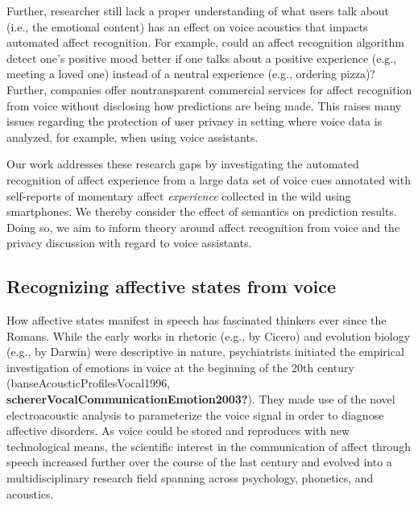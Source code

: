 \documentclass[
  english,
  man,floatsintext]{apa6}
\begin{document}
Further, researcher still lack a proper understanding of what users talk about (i.e., the emotional content) has an effect on voice acoustics that impacts automated affect recognition. For example, could an affect recognition algorithm detect one's positive mood better if one talks about a positive experience (e.g., meeting a loved one) instead of a neutral experience (e.g., ordering pizza)?
Further, companies offer nontransparent commercial services for affect recognition from voice without disclosing how predictions are being made. This raises many issues regarding the protection of user privacy in setting where voice data is analyzed, for example, when using voice assistants.

Our work addresses these research gaps by investigating the automated recognition of affect experience from a large data set of voice cues annotated with self-reports of momentary affect \emph{experience} collected in the wild using smartphones. We thereby consider the effect of semantics on prediction results. Doing so, we aim to inform theory around affect recognition from voice and the privacy discussion with regard to voice assistants.

\hypertarget{recognizing-affective-states-from-voice}{%
\subsection{Recognizing affective states from voice}\label{recognizing-affective-states-from-voice}}

How affective states manifest in speech has fascinated thinkers ever since the Romans. While the early works in rhetoric (e.g., by Cicero) and evolution biology (e.g., by Darwin) were descriptive in nature, psychiatrists initiated the empirical investigation of emotions in voice at the beginning of the 20th century (banseAcousticProfilesVocal1996, \textbf{schererVocalCommunicationEmotion2003?}). They made use of the novel electroacoustic analysis to parameterize the voice signal in order to diagnose affective disorders.
As voice could be stored and reproduces with new technological means, the scientific interest in the communication of affect through speech increased further over the course of the last century and evolved into a multidisciplinary research field spanning across psychology, phonetics, and acoustics.
\end{document}
